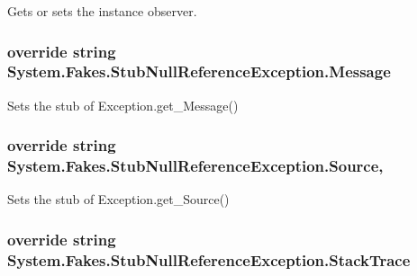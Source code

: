 Gets or sets the instance observer.

\hypertarget{class_system_1_1_fakes_1_1_stub_null_reference_exception_a99ca1cd25dbc8fe1de488a24beadb4b1}{
\subsubsection[{Message}]{\setlength{\rightskip}{0pt plus 5cm}override string System.\-Fakes.\-Stub\-Null\-Reference\-Exception.\-Message\hspace{0.3cm}{\ttfamily [get]}}}\label{class_system_1_1_fakes_1_1_stub_null_reference_exception_a99ca1cd25dbc8fe1de488a24beadb4b1}


Sets the stub of Exception.\-get\-\_\-\-Message()

\hypertarget{class_system_1_1_fakes_1_1_stub_null_reference_exception_a11c37624b140b9a0481a7723bbd7ced8}{
\subsubsection[{Source}]{\setlength{\rightskip}{0pt plus 5cm}override string System.\-Fakes.\-Stub\-Null\-Reference\-Exception.\-Source\hspace{0.3cm}{\ttfamily [get]}, {\ttfamily [set]}}}\label{class_system_1_1_fakes_1_1_stub_null_reference_exception_a11c37624b140b9a0481a7723bbd7ced8}


Sets the stub of Exception.\-get\-\_\-\-Source()

\hypertarget{class_system_1_1_fakes_1_1_stub_null_reference_exception_aef438efba4d7142d41759bf843f9e3d2}{
\subsubsection[{Stack\-Trace}]{\setlength{\rightskip}{0pt plus 5cm}override string System.\-Fakes.\-Stub\-Null\-Reference\-Exception.\-Stack\-Trace\hspace{0.3cm}{\ttfamily [get]}}}\label{class_system_1_1_fakes_1_1_stub_null_reference_exception_aef438efba4d7142d41759bf843f9e3d2}



